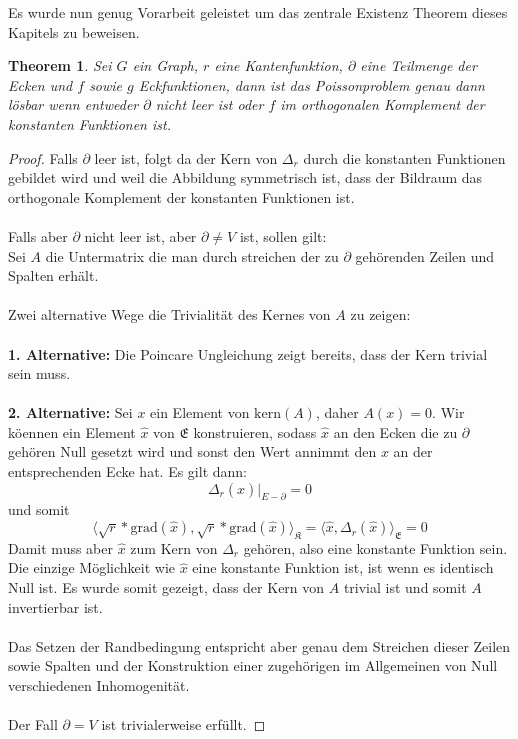 \documentclass[11pt,a4paper,leqno]{report}
\newtheorem{theorem}{Theorem}[chapter]
\numberwithin{equation}{chapter}
\begin{document}
\noindent
Es wurde nun genug Vorarbeit geleistet um das zentrale Existenz Theorem dieses Kapitels zu beweisen.
\begin{theorem}
	Sei $G$ ein Graph, $r$ eine Kantenfunktion, $\partial$ eine Teilmenge der Ecken und $f$ sowie $g$ Eckfunktionen, dann ist das Poissonproblem genau dann l\"osbar wenn entweder $\partial$ nicht leer ist oder $f$ im orthogonalen Komplement der konstanten Funktionen ist.
\end{theorem}
\begin{proof}
	Falls $\partial$ leer ist, folgt da der Kern von $\Delta_r$ durch die konstanten Funktionen gebildet wird und weil die Abbildung symmetrisch ist, dass der Bildraum das orthogonale Komplement der konstanten Funktionen ist.\\
	\\
	Falls aber $\partial$ nicht leer ist, aber $\partial\neq V$ ist, sollen gilt:\\
	Sei $A$ die Untermatrix die man durch streichen der zu $\partial$ geh\"orenden Zeilen und Spalten erh\"alt.\\
	\\
	Zwei alternative Wege die Trivialit\"at des Kernes von $A$ zu zeigen:\\
	\\
	\textbf{1. Alternative:} Die Poincare Ungleichung zeigt bereits, dass der Kern trivial sein muss.\\
	\\
	\textbf{2. Alternative:}  Sei $x$ ein Element von $\text{kern}(A)$, daher $A(x)=0$. Wir k\"oennen ein Element $\hat{x}$ von $\mathfrak{E}$ konstruieren, sodass $\hat{x}$ an den Ecken die zu $\partial$ geh\"oren Null gesetzt wird und sonst den Wert annimmt den $x$ an der entsprechenden Ecke hat. Es gilt dann:
	$$\Delta_r(\hat{x})|_{E-\partial} = 0$$
	und somit
	$$\langle \sqrt{r}*\text{grad}(\hat{x}),  \sqrt{r}*\text{grad}(\hat{x})\rangle_{\mathfrak{K}} = \langle \hat{x}, \Delta_r(\hat{x})\rangle_{\mathfrak{E}} = 0$$
	Damit muss aber $\hat{x}$ zum Kern von $\Delta_r$ geh\"oren, also eine konstante Funktion sein. Die einzige M\"oglichkeit wie $\hat{x}$ eine konstante Funktion ist, ist wenn es identisch Null ist. Es wurde somit gezeigt, dass der Kern von $A$ trivial ist und somit $A$ invertierbar ist.\\
	\\
	Das Setzen der Randbedingung entspricht aber genau dem Streichen dieser Zeilen sowie Spalten und der Konstruktion einer zugeh\"origen im Allgemeinen von Null verschiedenen Inhomogenit\"at.\\
	\\
	Der Fall $\partial=V$ ist trivialerweise erf\"ullt.
\end{proof}
\end{document}
